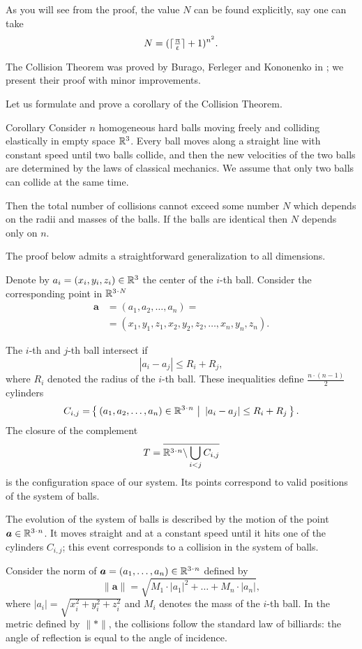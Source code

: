 As you will see from the proof,
the value $N$ can be found explicitly,
say one can take 
\[N=(\lceil\tfrac{\uppi}{\upvarepsilon}\rceil+1)^{n^2}.\]

The Collision Theorem was proved by Burago, Ferleger and Kononenko in \cite{BFK};
we present their proof with minor improvements.

Let us formulate and prove a corollary of the  Collision Theorem.

\begin{thm}{Corollary}\label{cor:balls}
Consider $n$ homogeneous hard balls
moving freely and colliding
elastically in empty space $\mathbb{R}^3$. 
Every ball moves
along a straight line with constant speed until two balls collide, and then
the new velocities of the two balls are determined by the
laws of classical mechanics. 
We assume that only two balls can collide at the same time.

Then the total number of collisions cannot exceed some number $N$ which depends on the radii and masses of the balls.
If the balls are identical then $N$ depends only on $n$.
\end{thm}


The proof below admits a straightforward generalization to all dimensions.

Denote by $a_i=(x_i,y_i,z_i) \in \RR^3$ the center of the $i$-th ball.
Consider the corresponding point in $\RR^{3\cdot N}$
\begin{align*}
\bm{a}&=(a_1, a_2 , \dots , a_n ) =
\\
&=(x_1, y_1 , z_1 , x_2 , y_2 , z_2 , \dots , x_n , y_n , z_n).
\end{align*}

The $i$-th and $j$-th ball intersect if 
$$|a_i - a_j | \le R_i+R_j,$$
where $R_i$ denoted the radius of the $i$-th ball.
These inequalities define $\tfrac{n\cdot(n-1)}{2}$ cylinders 
\[C_{i,j}=\set{(a_1, a_2 , \dots , a_n )\in\RR^{3\cdot n}} {|a_i - a_j | \le R_i+R_j}.\] 
The closure of the complement
\[T=\overline{\RR^{3\cdot n}\backslash \bigcup_{i< j} C_{i,j}}\] 
is the configuration space of our system. 
Its points correspond
to valid positions of the system of balls.

The evolution of the system
of balls is described by the motion of
the point $\bm{a}\in\RR^{3\cdot n}$.
It moves straight and at a
constant speed until it hits one of the cylinders $C_{i,j}$; 
this event corresponds
to a collision in the system of balls.

Consider the norm of $\bm{a}=(a_1,\dots,a_n)\in \RR^{3\cdot n}$ defined by
\[\lVert \bm{a}\rVert=\sqrt{M_1\cdot|a_1|^2+\dots+M_n\cdot |a_n|},\]
where $|a_i|=\sqrt{x_i^2+y_i^2+z_i^2}$ 
and $M_i$ denotes the mass of the $i$-th ball.
In the metric defined by $\lVert {*}\rVert$,
the collisions follow the
standard law of billiards: 
the angle of reflection is equal to the angle
of incidence. 

